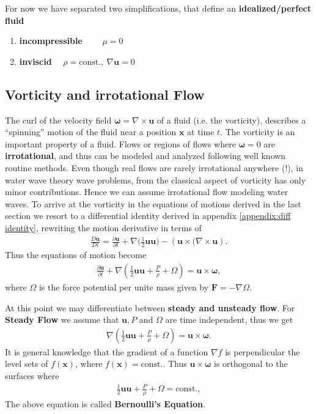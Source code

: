 For now we have separated two simplifications, that define an
\textbf{idealized/perfect fluid}
\begin{enumerate}
    \item \textbf{incompressible} $\qquad \mu=0$
    \item  \textbf{inviscid} $\quad \rho = \text{const.},\ \nabla \mathbf{u}=
        0$
\end{enumerate}
\subsection{Vorticity and irrotational Flow}
The curl of the velocity field $\mathbf{\omega} = \nabla \times \mathbf{u}$
of a fluid (i.e. the vorticity), describes a ``spinning'' motion of the fluid
near a position $\mathbf{x}$ at time $t$. The vorticity is an important
property of a fluid. Flows or regions of flows where $\mathbf{\omega}=0$ are
\textbf{irrotational}, and thus can be modeled and analyzed following well
known routine methods. Even though real flows are rarely irrotational
anywhere (!), in water wave theory wave problems, from the classical aspect
of vorticity has only minor contributions. Hence we can assume irrotational flow
modeling water waves. To arrive at the vorticity in the equations of motions
derived in the last section we resort to a differential identity derived in appendix
\ref{appendix:diff identity}, rewriting the motion derivative in terms of
\begin{align}
    \frac{D\mathbf{u}}{Dt} = \frac{\partial \mathbf{u}}{\partial t}
    +\nabla(\frac{1}{2}\mathbf{u}\mathbf{u)}
    - \left( \mathbf{u}\times (\nabla \times  \mathbf{u} \right).
\end{align}
Thus the equations of motion become
\begin{align}
    \frac{\partial \mathbf{u}}{\partial t} + \nabla\left(
    \frac{1}{2}\mathbf{u}\mathbf{u} + \frac{P}{\rho} + \Omega \right)
    = \mathbf{u} \times  \mathbf{\omega},
\end{align}
where $\Omega$ is the force potential per
unite mass given by $\mathbf{F} = -\nabla \Omega$.

At this point we may differentiate between \textbf{steady and unsteady flow}.
For \textbf{Steady Flow} we assume that $\mathbf{u}, P$ and $\Omega$ are time
independent, thus we get
\begin{align}
      \nabla\left( \frac{1}{2}\mathbf{u}\mathbf{u} + \frac{P}{\rho} + \Omega
      \right)  = \mathbf{u} \times  \mathbf{\omega}.
\end{align}
It is general knowledge that the gradient of a function $\nabla f$ is
perpendicular the level sets of $f(\mathbf{x})$, where $f(\mathbf{x}) =
\text{const.}$. Thus $\mathbf{u} \times  \mathbf{\omega}$ is orthogonal to
the surfaces  where
\begin{align} \label{eq:bernoulli}
    \frac{1}{2}\mathbf{u}\mathbf{u} + \frac{P}{\rho} + \Omega =
    \text{const.},
\end{align}
The above equation is called \textbf{Bernoulli's Equation}.

